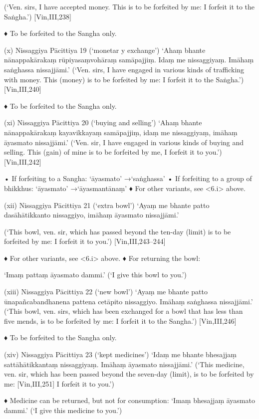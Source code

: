 (‘Ven. sirs, I have accepted money. This is to be
forfeited by me: I forfeit it to the Saṅgha.’)
[Vin,III,238]

♦ To be forfeited to the Sangha only.

(x) Nissaggiya Pācittiya 19 (‘monetar y exchange’)
‘Ahaṃ bhante nānappakārakaṃ rūpiyasaṃvohāraṃ samāpajjiṃ. Idaṃ me
nissaggiyaṃ. Imāhaṃ saṅghassa nissajjāmi.’
(‘Ven. sirs, I have engaged in various kinds of
trafficking with money. This (money) is to be
forfeited by me: I forfeit it to the Saṅgha.’)
[Vin,III,240]

♦ To be forfeited to the Sangha only.

(xi) Nissaggiya Pācittiya 20 (‘buying and selling’)
‘Ahaṃ bhante nānappakārakaṃ
kayavikkayaṃ samāpajjiṃ, idaṃ me
nissaggiyaṃ, imāhaṃ āyasmato nissajjāmi.’
(‘Ven. sir, I have engaged in various kinds of buying
and selling. This (gain) of mine is to be forfeited by
me, I forfeit it to you.’)
[Vin,III,242]

• If forfeiting to a Sangha:
‘āyasmato’ →‘saṅghassa’
• If forfeiting to a group of bhikkhus:
‘āyasmato’ →‘āyasmantānaṃ’
♦ For other variants, see <6.i> above.

(xii) Nissaggiya Pācittiya 21 (‘extra bowl’)
‘Ayaṃ me bhante patto dasāhātikkanto
nissaggiyo, imāhaṃ āyasmato nissajjāmi.’

(‘This bowl, ven. sir, which has passed beyond the
ten-day (limit) is to be forfeited by me:
I forfeit it to you.’)
[Vin,III,243–244]

♦ For other variants, see <6.i> above.
♦ For returning the bowl:

‘Imaṃ pattaṃ āyasmato dammi.’
(‘I give this bowl to you.’)

(xiii) Nissaggiya Pācittiya 22 (‘new bowl’)
‘Ayaṃ me bhante patto ūnapañcabandhanena pattena cetāpito nissaggiyo.
Imāhaṃ saṅghassa nissajjāmi.’
(‘This bowl, ven. sirs, which has been exchanged for
a bowl that has less than five mends, is to be forfeited
by me: I forfeit it to the Sangha.’)
[Vin,III,246]

♦ To be forfeited to the Sangha only.

(xiv) Nissaggiya Pācittiya 23 (‘kept medicines’)
‘Idaṃ me bhante bhesajjaṃ sattāhātikkantaṃ
nissaggiyaṃ. Imāhaṃ āyasmato nissajjāmi.’
(‘This medicine, ven. sir, which has been passed
beyond the seven-day (limit), is to be forfeited by me:
[Vin,III,251]
I forfeit it to you.’)

♦ Medicine can be returned, but not for consumption:
‘Imaṃ bhesajjaṃ āyasmato dammi.’
(‘I give this medicine to you.’)

